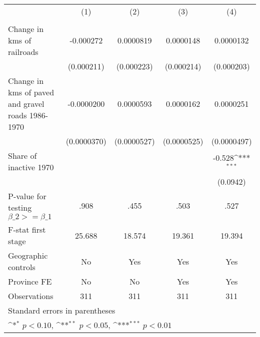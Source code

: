 {
\def\sym#1{\ifmmode^{#1}\else\(^{#1}\)\fi}
\begin{tabular}{l*{4}{c}}
\hline\hline
                &\multicolumn{1}{c}{(1)}&\multicolumn{1}{c}{(2)}&\multicolumn{1}{c}{(3)}&\multicolumn{1}{c}{(4)}\\
                &\multicolumn{1}{c}{}&\multicolumn{1}{c}{}&\multicolumn{1}{c}{}&\multicolumn{1}{c}{}\\
\hline
Change in kms of railroads&-0.000272         &0.0000819         &0.0000148         &0.0000132         \\
                &(0.000211)         &(0.000223)         &(0.000214)         &(0.000203)         \\
[1em]
Change in kms of paved and gravel roads 1986-1970&-0.0000200         &0.0000593         &0.0000162         &0.0000251         \\
                &(0.0000370)         &(0.0000527)         &(0.0000525)         &(0.0000497)         \\
[1em]
Share of inactive 1970&                  &                  &                  &   -0.528\sym{***}\\
                &                  &                  &                  & (0.0942)         \\
\hline
P-value for testing $\beta\_{2} >= \beta\_{1}$&     .908         &     .455         &     .503         &     .527         \\
F-stat first stage&   25.688         &   18.574         &   19.361         &   19.394         \\
Geographic controls&       No         &      Yes         &      Yes         &      Yes         \\
Province FE     &       No         &       No         &      Yes         &      Yes         \\
Observations    &      311         &      311         &      311         &      311         \\
\hline\hline
\multicolumn{5}{l}{\footnotesize Standard errors in parentheses}\\
\multicolumn{5}{l}{\footnotesize \sym{*} \(p<0.10\), \sym{**} \(p<0.05\), \sym{***} \(p<0.01\)}\\
\end{tabular}
}
